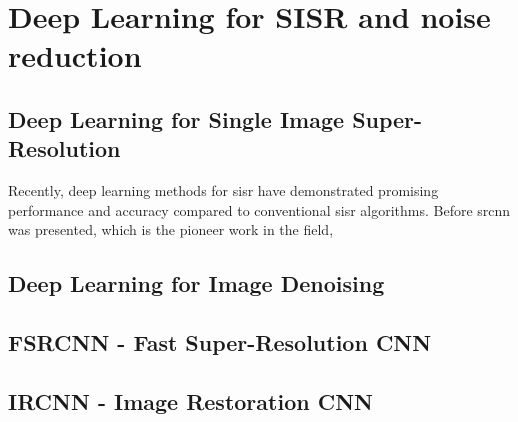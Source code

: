 \section{Deep Learning for SISR and noise reduction}\label{sec:deep_learning}

\subsection{Deep Learning for Single Image Super-Resolution}
Recently, deep learning methods for \gls{sisr} have demonstrated promising performance and accuracy compared to conventional \gls{sisr} algorithms. Before \gls{srcnn} \cite{SRCNN} was presented, which is the pioneer work in the field, \cite{SISRBENCH}

\subsection{Deep Learning for Image Denoising}
\subsection{FSRCNN - Fast Super-Resolution CNN}
\subsection{IRCNN - Image Restoration CNN}